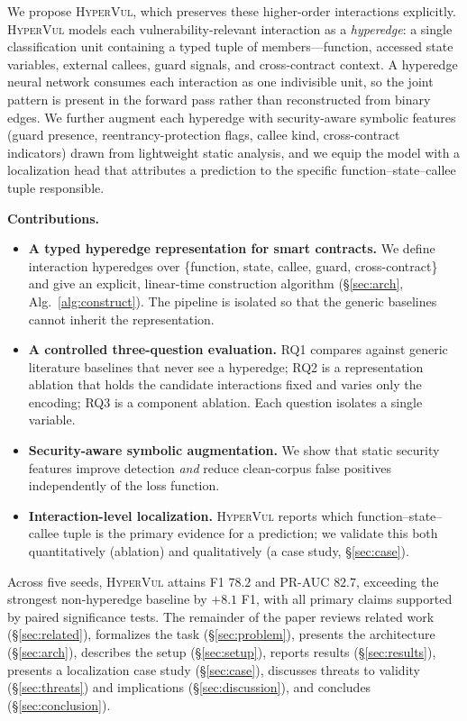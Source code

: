 \documentclass[conference]{IEEEtran}
\newcommand{\hypervul}{\textsc{HyperVul}}
\begin{document}
We propose \hypervul{}, which preserves these higher-order interactions explicitly.
\hypervul{} models each vulnerability-relevant interaction as a \emph{hyperedge}: a
single classification unit containing a typed tuple of members---function, accessed
state variables, external callees, guard signals, and cross-contract context. A
hyperedge neural network consumes each interaction as one indivisible unit, so the
joint pattern is present in the forward pass rather than reconstructed from binary
edges. We further augment each hyperedge with security-aware symbolic features (guard
presence, reentrancy-protection flags, callee kind, cross-contract indicators) drawn
from lightweight static analysis, and we equip the model with a localization head
that attributes a prediction to the specific function--state--callee tuple
responsible.

\noindent\textbf{Contributions.}
\begin{itemize}
  \item \textbf{A typed hyperedge representation for smart contracts.} We define
  interaction hyperedges over \{function, state, callee, guard, cross-contract\} and
  give an explicit, linear-time construction algorithm
  (\S\ref{sec:arch}, Alg.~\ref{alg:construct}). The pipeline is isolated so that the
  generic baselines cannot inherit the representation.
  \item \textbf{A controlled three-question evaluation.} RQ1 compares against generic
  literature baselines that never see a hyperedge; RQ2 is a representation ablation
  that holds the candidate interactions fixed and varies only the encoding; RQ3 is a
  component ablation. Each question isolates a single variable.
  \item \textbf{Security-aware symbolic augmentation.} We show that static security
  features improve detection \emph{and} reduce clean-corpus false positives
  independently of the loss function.
  \item \textbf{Interaction-level localization.} \hypervul{} reports which
  function--state--callee tuple is the primary evidence for a prediction; we validate
  this both quantitatively (ablation) and qualitatively (a case study,
  \S\ref{sec:case}).
\end{itemize}

Across five seeds, \hypervul{} attains F1 $78.2$ and PR-AUC $82.7$, exceeding the
strongest non-hyperedge baseline by $+8.1$ F1, with all primary claims supported by
paired significance tests. The remainder of the paper reviews related work
(\S\ref{sec:related}), formalizes the task (\S\ref{sec:problem}), presents the
architecture (\S\ref{sec:arch}), describes the setup (\S\ref{sec:setup}), reports
results (\S\ref{sec:results}), presents a localization case study (\S\ref{sec:case}),
discusses threats to validity (\S\ref{sec:threats}) and implications
(\S\ref{sec:discussion}), and concludes (\S\ref{sec:conclusion}).
\end{document}
